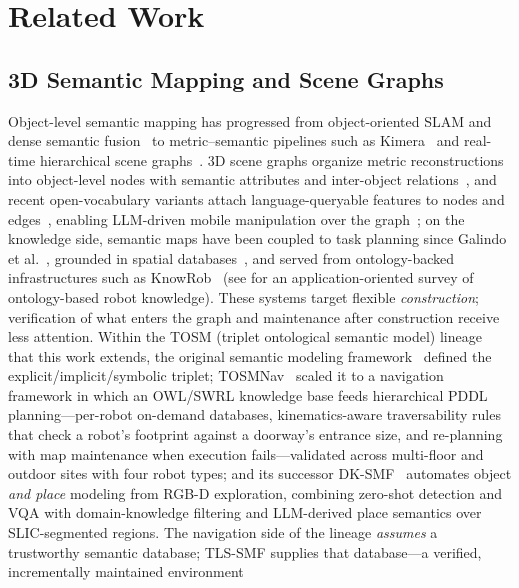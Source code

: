 \section{Related Work}
\label{sec:related}

\subsection{3D Semantic Mapping and Scene Graphs}
Object-level semantic mapping has progressed from object-oriented SLAM and
dense semantic fusion~\cite{salas2013slampp,mccormac2017semanticfusion} to
metric--semantic pipelines such as Kimera~\cite{rosinol2020kimera} and
real-time hierarchical scene graphs~\cite{hughes2022hydra}. 3D scene
graphs organize metric reconstructions into object-level nodes with
semantic attributes and inter-object relations~\cite{armeni20193dsg}, and
recent open-vocabulary variants attach language-queryable features to nodes
and edges~\cite{koch2024open3dsg,gu2024conceptgraphs}, enabling LLM-driven
mobile manipulation over the graph~\cite{honerkamp2024momallm}; on the
knowledge side, semantic maps have been coupled to task planning since
Galindo et al.~\cite{galindo2008task}, grounded in spatial
databases~\cite{deeken2018semap}, and served from ontology-backed
infrastructures such as KnowRob~\cite{tenorth2013knowrob} (see
\cite{manzoor2021survey} for an application-oriented survey of
ontology-based robot knowledge). These systems
target flexible \emph{construction}; verification of what enters the graph
and maintenance after construction receive less attention. Within the TOSM
(triplet ontological semantic model) lineage that this work extends, the
original semantic modeling framework~\cite{joo2020tosm} defined the
explicit/implicit/symbolic triplet; TOSMNav~\cite{joo2022fsom} scaled it
to a navigation framework in which an OWL/SWRL knowledge base feeds
hierarchical PDDL planning---per-robot on-demand databases,
kinematics-aware traversability rules that check a robot's footprint
against a doorway's entrance size, and re-planning with map maintenance
when execution fails---validated across multi-floor and outdoor sites
with four robot types; and its successor DK-SMF~\cite{joo2025dksmf}
automates object \emph{and place} modeling from RGB-D exploration, combining
zero-shot detection and VQA with domain-knowledge filtering and LLM-derived
place semantics over SLIC-segmented regions. The navigation side of the
lineage \emph{assumes} a trustworthy semantic database; TLS-SMF supplies
that database---a verified, incrementally maintained environment
